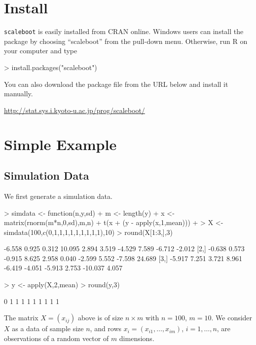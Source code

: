 \documentclass[a4paper]{amsart}
\begin{document}
\section{Install}

{\tt scaleboot} is easily installed from CRAN online.  Windows users
can install the package by choosing ``scaleboot'' from the pull-down
menu.  Otherwise, run R on your computer and type
\begin{Schunk}
\begin{Sinput}
> install.packages("scaleboot")
\end{Sinput}
\end{Schunk}
You can also download the package file from the URL below and
install it manually.

\url{http://stat.sys.i.kyoto-u.ac.jp/prog/scaleboot/}


\section{Simple Example}

\subsection{Simulation Data}

We first generate a simulation data.
\begin{Schunk}
\begin{Sinput}
> simdata <- function(n,y,sd) {
+   m <- length(y)
+   x <- matrix(rnorm(m*n,0,sd),m,n)
+   t(x + (y - apply(x,1,mean)))
+ }
> X <- simdata(100,c(0,1,1,1,1,1,1,1,1,1),10)
> round(X[1:3,],3)
\end{Sinput}
\begin{Soutput}
       [,1]  [,2]   [,3]   [,4]   [,5]   [,6]   [,7]  [,8]    [,9]  [,10]
[1,] -6.558 0.925  0.312 10.095  2.894  3.519 -4.529 7.589  -6.712 -2.012
[2,] -0.638 0.573 -0.915  8.625  2.958  0.040 -2.599 5.552  -7.598 24.689
[3,] -5.917 7.251  3.721  8.961 -6.419 -4.051 -5.913 2.753 -10.037  4.057
\end{Soutput}
\begin{Sinput}
> y <- apply(X,2,mean)
> round(y,3)
\end{Sinput}
\begin{Soutput}
 [1] 0 1 1 1 1 1 1 1 1 1
\end{Soutput}
\end{Schunk}
The matrix $X=(x_{ij})$ above is of size $n\times m$ with $n=100$,
$m=10$. We consider $X$ as a data of sample size $n$, and rows
$x_i = (x_{i1},\ldots,x_{im})$, $i=1,\ldots,n$, are observations of a
random vector of $m$ dimensions.
\end{document}
